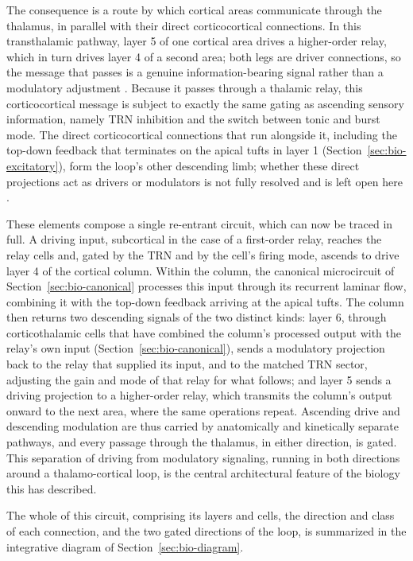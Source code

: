 The consequence is a route by which cortical areas communicate through the thalamus, in parallel with their direct corticocortical 
connections. In this transthalamic pathway, layer 5 of one cortical area drives a higher-order relay, which in turn drives layer 4 
of a second area; both legs are driver connections, so the message that passes is a genuine information-bearing signal rather than 
a modulatory adjustment \parencite{sherman2011, sherman2013}. Because it passes through a thalamic relay, this corticocortical message 
is subject to exactly the same gating as ascending sensory information, namely TRN inhibition and the switch between tonic and burst mode. The direct 
corticocortical connections that run alongside it, including the top-down feedback that terminates on the apical tufts in layer 1 
(Section~\ref{sec:bio-excitatory}), form the loop's other descending limb; whether these direct projections act as drivers or 
modulators is not fully resolved and is left open here \parencite{sherman1998}.

These elements compose a single re-entrant circuit, which can now be traced in full. A driving input, subcortical in the case of a first-order relay, reaches the relay cells and, gated by the TRN and by the cell's firing mode, ascends to drive layer 4 of the cortical column. 
Within the column, the canonical microcircuit of Section~\ref{sec:bio-canonical} processes this input through its recurrent laminar 
flow, combining it with the top-down feedback arriving at the apical tufts. The column then returns two descending signals of the two 
distinct kinds: layer 6, through corticothalamic cells that have combined the column's processed output with the relay's own input (Section~\ref{sec:bio-canonical}), sends a modulatory projection back to the relay that supplied its input, and to the matched TRN sector, 
adjusting the gain and mode of that relay for what follows; and layer 5 sends a driving projection to a higher-order relay, which 
transmits the column's output onward to the next area, where the same operations repeat. Ascending drive and descending modulation 
are thus carried by anatomically and kinetically separate pathways, and every passage through the thalamus, in either direction, is gated. This separation of driving from modulatory signaling, running in both directions around a thalamo-cortical loop, is the central 
architectural feature of the biology this \unitname{} has described.

The whole of this circuit, comprising its layers and cells, the direction and class of each connection, and the two gated directions of the loop, is summarized in the integrative diagram of Section~\ref{sec:bio-diagram}.

